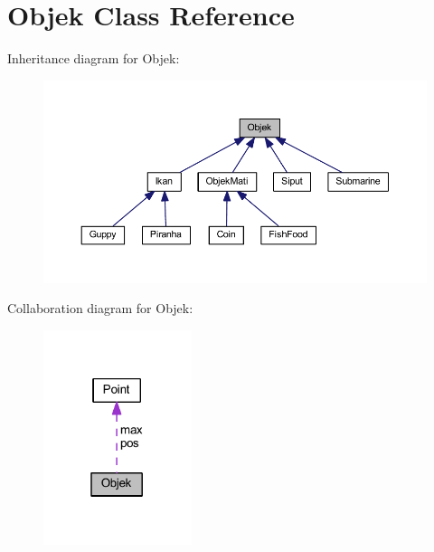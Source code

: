 \hypertarget{class_objek}{}\section{Objek Class Reference}
\label{class_objek}


Inheritance diagram for Objek\+:\nopagebreak
\begin{figure}[H]
\begin{center}
\leavevmode
\includegraphics[width=350pt]{class_objek__inherit__graph}
\end{center}
\end{figure}


Collaboration diagram for Objek\+:\nopagebreak
\begin{figure}[H]
\begin{center}
\leavevmode
\includegraphics[width=123pt]{class_objek__coll__graph}
\end{center}
\end{figure}
